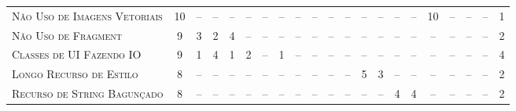 \begin{table*}
\begin{tabular}{@{}p{4.2cm}p{0.3cm}p{.2cm}p{.2cm}p{.2cm}p{.2cm}p{.2cm}p{.2cm}p{.2cm}p{.2cm}p{.2cm}p{.4cm}p{.4cm}p{.4cm}p{.4cm}p{.4cm}p{.4cm}p{.4cm}p{.4cm}p{.4cm}p{0.2cm}@{}}
\textsc{Não Uso de Imagens Vetoriais}      	& \multicolumn{1}{c}{10} 	& \multicolumn{1}{c}{--} 	& \multicolumn{1}{c}{--} 	& \multicolumn{1}{c}{--} 	& \multicolumn{1}{c}{--} 	& \multicolumn{1}{c}{--} 	& \multicolumn{1}{c}{--} 	& \multicolumn{1}{c}{--} 	& \multicolumn{1}{c}{--} 	& \multicolumn{1}{c}{--} 	& \multicolumn{1}{c}{--} 	& \multicolumn{1}{c}{--} 	& \multicolumn{1}{c}{--} 	& \multicolumn{1}{c}{--} 	& \multicolumn{1}{c}{--} 	& \multicolumn{1}{c}{10}	& \multicolumn{1}{c}{--} 	& \multicolumn{1}{c}{--} 	& \multicolumn{1}{c}{--} 	& \multicolumn{1}{c}{1} \\
\textsc{Não Uso de Fragment}               	& \multicolumn{1}{c}{9} 	& \multicolumn{1}{c}{3} 	& \multicolumn{1}{c}{2} 	& \multicolumn{1}{c}{4}	 	& \multicolumn{1}{c}{--} 	& \multicolumn{1}{c}{--} 	& \multicolumn{1}{c}{--} 	& \multicolumn{1}{c}{--} 	& \multicolumn{1}{c}{--} 	& \multicolumn{1}{c}{--} 	& \multicolumn{1}{c}{--} 	& \multicolumn{1}{c}{--} 	& \multicolumn{1}{c}{--} 	& \multicolumn{1}{c}{--} 	& \multicolumn{1}{c}{--} 	& \multicolumn{1}{c}{--}	& \multicolumn{1}{c}{--} 	& \multicolumn{1}{c}{--} 	& \multicolumn{1}{c}{--} 	& \multicolumn{1}{c}{2} \\
\textsc{Classes de UI Fazendo IO}          	& \multicolumn{1}{c}{9} 	& \multicolumn{1}{c}{1} 	& \multicolumn{1}{c}{4} 	& \multicolumn{1}{c}{1}	 	& \multicolumn{1}{c}{2} 	& \multicolumn{1}{c}{--} 	& \multicolumn{1}{c}{1} 	& \multicolumn{1}{c}{--} 	& \multicolumn{1}{c}{--} 	& \multicolumn{1}{c}{--} 	& \multicolumn{1}{c}{--} 	& \multicolumn{1}{c}{--} 	& \multicolumn{1}{c}{--} 	& \multicolumn{1}{c}{--} 	& \multicolumn{1}{c}{--} 	& \multicolumn{1}{c}{--}	& \multicolumn{1}{c}{--} 	& \multicolumn{1}{c}{--} 	& \multicolumn{1}{c}{--} 	& \multicolumn{1}{c}{4} \\
\textsc{Longo Recurso de Estilo}           	& \multicolumn{1}{c}{8} 	& \multicolumn{1}{c}{--} 	& \multicolumn{1}{c}{--} 	& \multicolumn{1}{c}{--} 	& \multicolumn{1}{c}{--} 	& \multicolumn{1}{c}{--} 	& \multicolumn{1}{c}{--} 	& \multicolumn{1}{c}{--} 	& \multicolumn{1}{c}{--} 	& \multicolumn{1}{c}{--} 	& \multicolumn{1}{c}{--} 	& \multicolumn{1}{c}{5} 	& \multicolumn{1}{c}{3} 	& \multicolumn{1}{c}{--} 	& \multicolumn{1}{c}{--} 	& \multicolumn{1}{c}{--}	& \multicolumn{1}{c}{--} 	& \multicolumn{1}{c}{--} 	& \multicolumn{1}{c}{--} 	& \multicolumn{1}{c}{2} \\
\textsc{Recurso de String Bagunçado}       	& \multicolumn{1}{c}{8} 	& \multicolumn{1}{c}{--} 	& \multicolumn{1}{c}{--} 	& \multicolumn{1}{c}{--} 	& \multicolumn{1}{c}{--} 	& \multicolumn{1}{c}{--} 	& \multicolumn{1}{c}{--} 	& \multicolumn{1}{c}{--} 	& \multicolumn{1}{c}{--} 	& \multicolumn{1}{c}{--} 	& \multicolumn{1}{c}{--} 	& \multicolumn{1}{c}{--} 	& \multicolumn{1}{c}{--} 	& \multicolumn{1}{c}{4} 	& \multicolumn{1}{c}{4} 	& \multicolumn{1}{c}{--}	& \multicolumn{1}{c}{--} 	& \multicolumn{1}{c}{--} 	& \multicolumn{1}{c}{--} 	& \multicolumn{1}{c}{2} \\

\end{tabular}
\end{table*}
